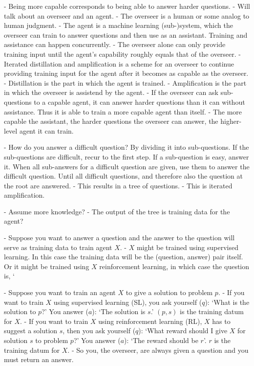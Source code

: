 \documentclass{farlamp}
\begin{document}
- Being more capable corresponds to being able to answer harder questions.
- Will talk about an overseer and an agent.
- The overseer is a human or some analog to human judgment.
- The agent is a machine learning (sub-)system, which the overseer can train to
answer questions and then use as an assistant. Training and assistance can
happen concurrently.
- The overseer alone can only provide training input until the agent's
capability roughly equals that of the overseer.
- Iterated distillation and amplification is a scheme for an overseer to
continue providing training input for the agent after it becomes as capable as
the overseer.
- Distillation is the part in which the agent is trained.
- Amplification is the part in which the overseer is assistend by the agent.
- If the overseer can ask sub-questions to a capable agent, it can
answer harder questions than it can without assistance. Thus it is able to train
a more capable agent than itself.
- The more capable the assistant, the harder questions the overseer can answer,
the higher-level agent it can train.

- How do you answer a difficult question? By dividing it into sub-questions. If
the sub-questions are difficult, recur to the first step. If a sub-question is
easy, answer it. When all sub-answers for a difficult question are given, use
them to answer the difficult question. Until all difficult questions, and
therefore also the question at the root are answered.
- This results in a tree of questions.
- This is iterated amplification.

- Assume more knowledge?
- The output of the tree is training data for the agent?

- Suppose you want to answer a question and the answer to the question will
serve as training data to train agent $X$.
- $X$ might be trained using supervised learning. In this case the training data
will be the (question, answer) pair itself. Or it might be trained using $X$
reinforcement learning, in which case the question is, ‘ 


- Suppose you want to train an agent $X$ to give a solution to problem $p$.
- If you want to train $X$ using supervised learning (SL), you ask yourself
($q$): ‘What is the solution to $p$?’ You answer ($a$): ‘The solution is $s$.’
$(p, s)$ is the training datum for $X$.
- If you want to train $X$ using reinforcement learning (RL), $X$ has to suggest
a solution $s$, then you ask yourself ($q$): ‘What reward should I give $X$ for
solution $s$ to problem $p$?’ You answer ($a$): ‘The reward should be $r$’. $r$
is the training datum for $X$.
- So you, the overseer, are always given a question and you must return an
answer.
\end{document}
